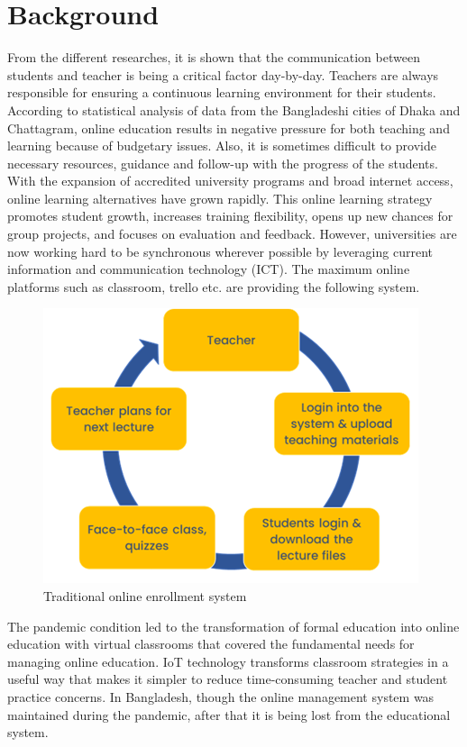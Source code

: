 \section{Background}
From the different researches, it is shown that the communication between students and teacher is being a critical factor day-by-day. Teachers are always responsible for ensuring a continuous learning environment for their students. According to statistical analysis of data from the Bangladeshi cities of Dhaka and Chattagram, online education results in negative pressure for both teaching and learning because of budgetary issues.\cite{rahman2021statistical}  Also, it is sometimes difficult to provide necessary resources, guidance and follow-up with the progress of the students. With the expansion of accredited university programs and broad internet access, online learning alternatives have grown rapidly. This online learning strategy promotes student growth, increases training flexibility, opens up new chances for group projects, and focuses on evaluation and feedback. However, universities are now working hard to be synchronous wherever possible by leveraging current information and communication technology (ICT). The maximum online platforms such as classroom, trello etc. are providing the following system.
\begin{figure}[H]
    \centering
    \includegraphics[scale=.9]{img/traditional.png}
    \caption{Traditional online enrollment system}
    \label{fig:System Architecture}
\end{figure}

The pandemic condition led to the transformation of formal education into online education with virtual classrooms that covered the fundamental needs for managing online education. IoT technology transforms classroom strategies in a useful way that makes it simpler to reduce time-consuming teacher and student practice concerns. In Bangladesh, though the online management system was maintained during the pandemic, after that it is being lost from the educational system. \\

